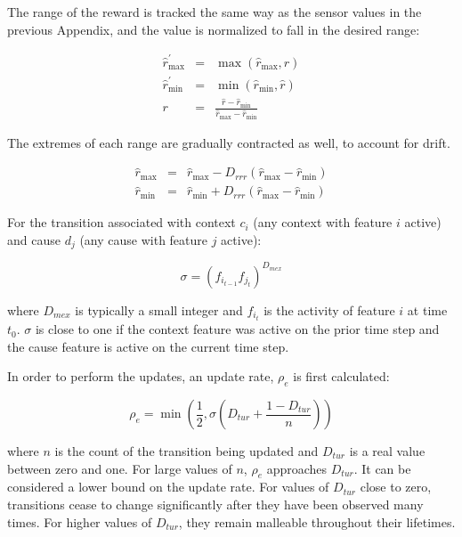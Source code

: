 The range of the reward is tracked the same way as the sensor values in the previous Appendix, and the value is normalized to fall in the desired range:

\begin{eqnarray}
\hat{r}_{\max}^{\prime} &=& \max \left ( \hat{r}_{\max}, \hat{r} \right ) \\
\hat{r}_{\min}^{\prime} &=& \min \left ( \hat{r}_{\min}, \hat{r} \right ) \\
r &=& \frac{\hat{r} -  \hat{r}_{\min}}{\hat{r}_{\max} -  \hat{r}_{\min}}
\end{eqnarray}

The extremes of each range are gradually contracted as well, to account for drift.

\begin{eqnarray}
\hat{r}_{\max} &=& \hat{r}_{\max} - D_{rrr} ( \hat{r}_{\max} -  \hat{r}_{\min}) \\
\hat{r}_{\min} &=& \hat{r}_{\min}  + D_{rrr} (\hat{r}_{\max} -  \hat{r}_{\min}) 
\end{eqnarray}


For the transition associated with context $c_i$ (any context with feature $i$ active) and cause $d_j$ (any cause with feature $j$ active):

\begin{equation}
\sigma = (f_{i_{t - 1}} f_{j_t}) ^ {D_{mex}}
\end{equation}

where $D_{mex}$ is typically a small integer and $f_{i_t}$ is the activity of feature $i$ at time $t_0$. $\sigma$ is close to one if the context feature was active on the prior time step and the cause feature is active on the current time step. 

In order to perform the updates, an update rate, $\rho_e$ is first calculated:

\begin{equation}
\rho_e = \min \left (\frac{1}{2}, \sigma \left ( D_{tur}+ \frac{1 - D_{tur}}{n} \right ) \right )
\end{equation}
        
where $n$ is the count of the transition being updated and $D_{tur}$ is a real value between zero and one. For large values of $n$, $\rho_e$ approaches $D_{tur}$. It can be considered a lower bound on the update rate. For values of $D_{tur}$ close to zero, transitions cease to change significantly after they have been observed many times. For higher values of $D_{tur}$, they remain malleable throughout their lifetimes.

